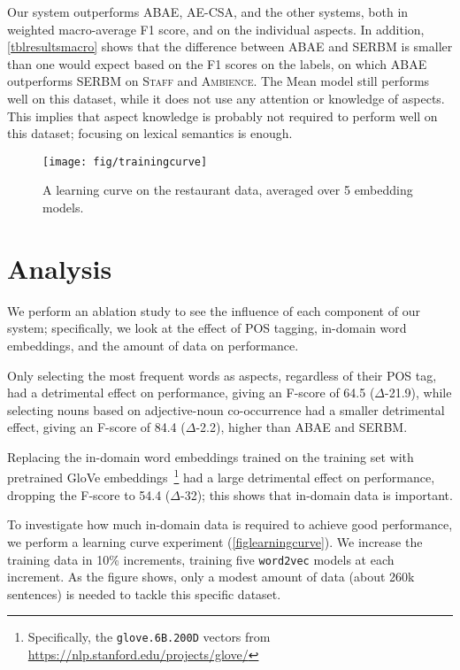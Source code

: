 \documentclass[11pt,a4paper]{article}
\begin{document}
Our system outperforms ABAE, AE-CSA, and the other systems, both in weighted macro-average F1 score, and on the individual aspects.
In addition, \ref{tblresultsmacro} shows that the difference between ABAE and SERBM is smaller than one would expect based on the F1 scores on the labels, on which ABAE outperforms SERBM on \textsc{Staff} and \textsc{Ambience}.
The Mean model still performs well on this dataset,
while it does not use any attention or knowledge of aspects.
This implies that aspect knowledge is probably not required to perform well on this dataset; focusing on lexical semantics is enough.




\begin{figure}[t]\centering
    \texttt{[image: fig/trainingcurve]}
    \caption{A learning curve on the restaurant data, averaged over 5 embedding models.}
    \label{figlearningcurve}
\end{figure}

\section{Analysis}\label{secanalysis}
We perform an ablation study to see the influence of each component of our system;
specifically, we look at the effect of POS tagging, in-domain word embeddings, and the amount of data on performance.

Only selecting the most frequent words as aspects, regardless of their POS tag, had a detrimental effect on performance, giving an F-score of 64.5 ($\Delta$-21.9), while selecting nouns based on adjective-noun co-occurrence had a smaller detrimental effect, giving an F-score of 84.4 ($\Delta$-2.2), higher than ABAE and SERBM.

Replacing the in-domain word embeddings trained on the training set
with pretrained GloVe embeddings~\citep{pennington2014glove}\footnote{Specifically, the \texttt{glove.6B.200D} vectors from \url{https://nlp.stanford.edu/projects/glove/}}
had a large detrimental effect on performance, dropping the F-score to 54.4 ($\Delta$-32); this shows that in-domain data is important.

To investigate how much in-domain data is required to achieve good performance, we perform a learning curve experiment (\autoref{figlearningcurve}).
We increase the training data in 10\% increments,
training five \texttt{word2vec} models at each increment.
As the figure shows, only a modest amount of data
(about 260k sentences) is needed to tackle this specific dataset.
\end{document}
